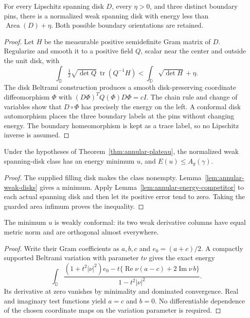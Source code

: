 \begin{lemma}
\label{lem:annular-energy-competitor}
For every Lipschitz spanning disk $D$, every $\eta>0$, and
three distinct boundary pins, there is a normalized weak spanning
disk with energy less than $\operatorname{Area}(D)+\eta$.
Both possible boundary orientations are retained.
\end{lemma}
\begin{proof}
Let $H$ be the measurable positive semidefinite Gram matrix of $D$.
Regularize and smooth it to a positive field $Q$, scalar near the
center and outside the unit disk, with
\[
 \int_{\mathbb D}\tfrac12\sqrt{\det Q}\,
       \operatorname{tr}(Q^{-1}H)
 <\int_{\mathbb D}\sqrt{\det H}+\eta .
\]
The disk Beltrami construction produces a smooth disk-preserving
coordinate diffeomorphism $\Phi$ with
$(D\Phi)^TQ(\Phi)D\Phi=cI$. The chain rule and change of variables
show that $D\circ\Phi$ has precisely the energy on the left.
A conformal disk automorphism places the three boundary labels
at the pins without changing energy. The boundary homeomorphism
is kept as a trace label, so no Lipschitz inverse is assumed.
\end{proof}

\begin{lemma}
\label{lem:annular-disk-minimum}
Under the hypotheses of Theorem~\ref{thm:annular-plateau}, the
normalized weak spanning-disk class has an energy minimum $u$,
and $E(u)\leq A_g(\gamma)$.
\end{lemma}
\begin{proof}
The supplied filling disk makes the class nonempty.
Lemma~\ref{lem:annular-weak-disks} gives a minimum.
Apply Lemma~\ref{lem:annular-energy-competitor} to each actual
spanning disk and then let its positive error tend to zero.
Taking the guarded area infimum proves the inequality.
\end{proof}

\begin{lemma}
\label{lem:annular-disk-conformal}
The minimum $u$ is weakly conformal: its two weak derivative
columns have equal metric norm and are orthogonal almost everywhere.
\end{lemma}
\begin{proof}
Write their Gram coefficients as $a,b,c$ and $e_0=(a+c)/2$.
A compactly supported Beltrami variation with parameter $t\nu$
gives the exact energy
\[
 \int_{\mathbb D}
 \frac{(1+t^2|\nu|^2)e_0
       -t\{\operatorname{Re}\nu(a-c)+2\operatorname{Im}\nu\,b\}}
      {1-t^2|\nu|^2}.
\]
Its derivative at zero vanishes by minimality and dominated
convergence. Real and imaginary test functions yield $a=c$ and
$b=0$. No differentiable dependence of the chosen coordinate
maps on the variation parameter is required.
\end{proof}

